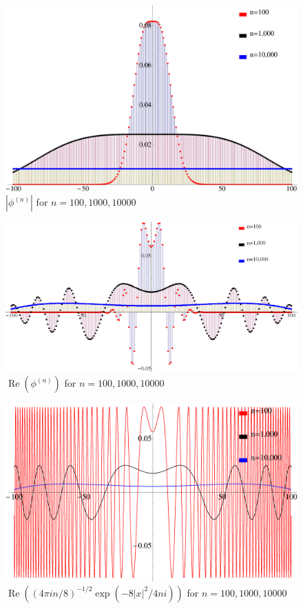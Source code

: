 \documentclass{article}
\theoremstyle{theorem}
\theoremstyle{remark}
\renewcommand\Re{\operatorname{Re}}%
\begin{document}
\vspace{1in}

\begin{figure}[h!]
\centering\includegraphics[width=5in]{ex1abs.eps}
\caption{$|\phi^{(n)}|$ for $n=100,1000,10000$}
\label{fig:ex1abs}
\end{figure}

\begin{figure}[h!]
\centering\includegraphics[width=5in]{ex1real.eps}
 \caption{$\Re(\phi^{(n)})$ for $n=100, 1000, 10000$}
\label{fig:ex1real}
\end{figure}

\begin{figure}[h!]
\centering\includegraphics[width=5in]{ex1realtheory.eps}
 \caption{$\Re((4\pi in/8)^{-1/2}\exp(-8|x|^2/4ni))$ for $n=100, 1000,
10000$}
\label{fig:ex1realtheory}
\end{figure}
\end{document}
